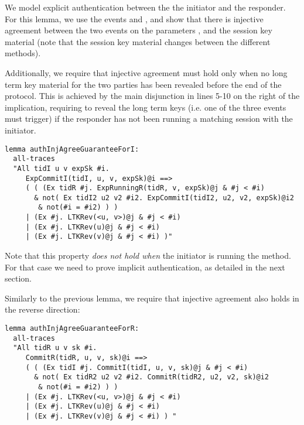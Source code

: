 We model explicit authentication between the the initiator and the
responder.
%
For this lemma, we use the events  and
, and show that there is injective agreement
between the two events on the parameters ,
 and the session key material  (note
that the session key material changes between the different \mEdhoc
methods).

Additionally, we require that injective agreement must hold only when
no long term key material for the two parties has been revealed before
the end of the protocol.
%
This is achieved by the main disjunction in lines 5-10 on the right of
the implication, requiring to reveal the long term keys (i.e. one of
the three  events must trigger) if the responder has
not been running a matching session with the initiator.

\begin{lstlisting}
lemma authInjAgreeGuaranteeForI:
  all-traces
  "All tidI u v expSk #i.
     ExpCommitI(tidI, u, v, expSk)@i ==>
     ( ( (Ex tidR #j. ExpRunningR(tidR, v, expSk)@j & #j < #i)
       & not( Ex tidI2 u2 v2 #i2. ExpCommitI(tidI2, u2, v2, expSk)@i2
        & not(#i = #i2) ) )
     | (Ex #j. LTKRev(<u, v>)@j & #j < #i)
     | (Ex #j. LTKRev(u)@j & #j < #i)
     | (Ex #j. LTKRev(v)@j & #j < #i) )"
\end{lstlisting}

Note that this property \emph{does not hold when} the initiator is
running the \mStat method.
%
For that case we need to prove implicit authentication, as detailed in
the next section.

Similarly to the previous lemma, we require that injective agreement also holds
in the reverse direction:

\begin{lstlisting}
lemma authInjAgreeGuaranteeForR:
  all-traces
  "All tidR u v sk #i.
     CommitR(tidR, u, v, sk)@i ==>
     ( ( (Ex tidI #j. CommitI(tidI, u, v, sk)@j & #j < #i)
       & not( Ex tidR2 u2 v2 #i2. CommitR(tidR2, u2, v2, sk)@i2
        & not(#i = #i2) ) )
     | (Ex #j. LTKRev(<u, v>)@j & #j < #i)
     | (Ex #j. LTKRev(u)@j & #j < #i)
     | (Ex #j. LTKRev(v)@j & #j < #i) ) "
\end{lstlisting}

